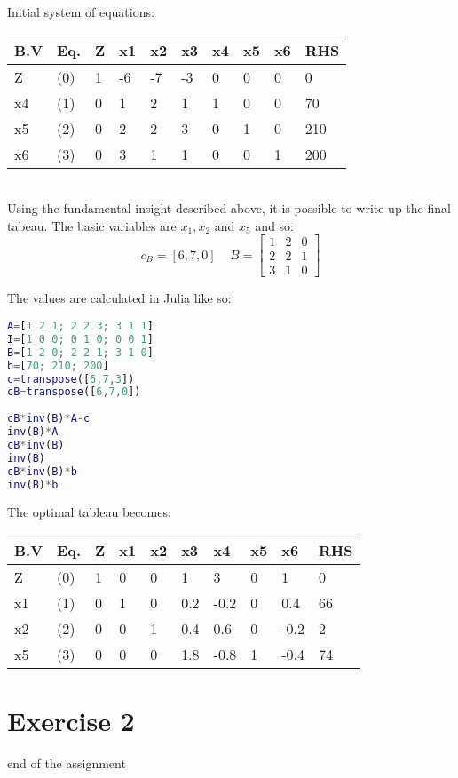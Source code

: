 \documentclass{article}
\begin{document}
\vspace{5mm}
Initial system of equations:

\vspace{5mm}
\begin{tabular}{|l|l|l|l l l l l l|l|}
  \hline
  B.V           & Eq. & Z & x1 & x2 & x3 & x4 & x5 & x6 & RHS \\ \hline
  Z             & (0) & 1 & -6 & -7 & -3 & 0  & 0  & 0  & 0   \\ \hline
  x4            & (1) & 0 & 1  & 2  & 1  & 1  & 0  & 0  & 70  \\ \hline
  x5            & (2) & 0 & 2  & 2  & 3  & 0  & 1  & 0  & 210 \\ \hline
  x6            & (3) & 0 & 3  & 1  & 1  & 0  & 0  & 1  & 200 \\ \hline
\end{tabular}
\vspace{5mm}
\\
Using the fundamental insight described above, it is possible to write up the final tabeau. 
The basic variables are $x_1, x_2$ and $x_5$ and so:
\[c_B=[6, 7, 0] \ \ \ \ \ B=
\begin{bmatrix}
  1 & 2 & 0 \\
  2 & 2 & 1 \\
  3 & 1 & 0
\end{bmatrix}
\]

\pagebreak
The values are calculated in Julia like so:

\vspace{5mm}
\begin{file}[Project 1.jl]
	\begin{lstlisting}[language=matlab]
A=[1 2 1; 2 2 3; 3 1 1]
I=[1 0 0; 0 1 0; 0 0 1]
B=[1 2 0; 2 2 1; 3 1 0]
b=[70; 210; 200]
c=transpose([6,7,3])
cB=transpose([6,7,0])
   
cB*inv(B)*A-c
inv(B)*A
cB*inv(B)
inv(B)
cB*inv(B)*b
inv(B)*b    
	\end{lstlisting}
\end{file}


\vspace{5mm}
The optimal tableau becomes:

\vspace{5mm}
\begin{tabular}{|l|l|l|l l l l l l|l|}
  \hline
  B.V           & Eq. & Z & x1 & x2 & x3 & x4 & x5 & x6 & RHS \\ \hline
  Z             & (0) & 1 & 0 & 0 & 1 & 3 & 0 & 1 & 0   \\ \hline
  x1            & (1) & 0 & 1 & 0 & 0.2 & -0.2 & 0 & 0.4 & 66  \\ \hline
  x2            & (2) & 0 & 0 & 1 & 0.4 & 0.6 & 0 & -0.2 & 2 \\ \hline
  x5            & (3) & 0 & 0 & 0 & 1.8 & -0.8 & 1 & -0.4 & 74 \\ \hline
\end{tabular}


\section{Exercise 2} %





\hrulefill 
end of the assignment
\end{document}
